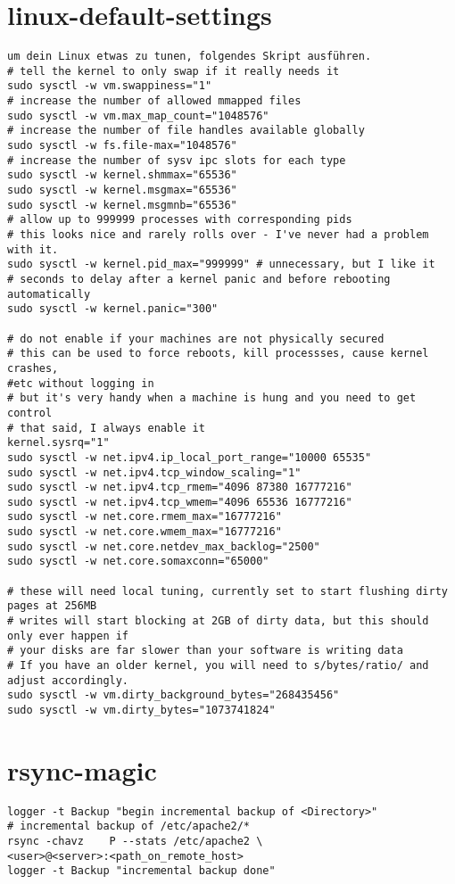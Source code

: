 \documentclass[a4paper,10pt]{report}
\begin{document}
\section{linux-default-settings}
\begin{verbatim}
um dein Linux etwas zu tunen, folgendes Skript ausführen.
# tell the kernel to only swap if it really needs it
sudo sysctl -w vm.swappiness="1"
# increase the number of allowed mmapped files
sudo sysctl -w vm.max_map_count="1048576"
# increase the number of file handles available globally
sudo sysctl -w fs.file-max="1048576"
# increase the number of sysv ipc slots for each type
sudo sysctl -w kernel.shmmax="65536"
sudo sysctl -w kernel.msgmax="65536"
sudo sysctl -w kernel.msgmnb="65536"
# allow up to 999999 processes with corresponding pids
# this looks nice and rarely rolls over - I've never had a problem with it.
sudo sysctl -w kernel.pid_max="999999" # unnecessary, but I like it
# seconds to delay after a kernel panic and before rebooting automatically
sudo sysctl -w kernel.panic="300"

# do not enable if your machines are not physically secured
# this can be used to force reboots, kill processses, cause kernel crashes, 
#etc without logging in
# but it's very handy when a machine is hung and you need to get control
# that said, I always enable it
kernel.sysrq="1"
sudo sysctl -w net.ipv4.ip_local_port_range="10000 65535"
sudo sysctl -w net.ipv4.tcp_window_scaling="1"
sudo sysctl -w net.ipv4.tcp_rmem="4096 87380 16777216"
sudo sysctl -w net.ipv4.tcp_wmem="4096 65536 16777216"
sudo sysctl -w net.core.rmem_max="16777216"
sudo sysctl -w net.core.wmem_max="16777216"
sudo sysctl -w net.core.netdev_max_backlog="2500"
sudo sysctl -w net.core.somaxconn="65000"

# these will need local tuning, currently set to start flushing dirty pages at 256MB
# writes will start blocking at 2GB of dirty data, but this should only ever happen if
# your disks are far slower than your software is writing data
# If you have an older kernel, you will need to s/bytes/ratio/ and adjust accordingly.
sudo sysctl -w vm.dirty_background_bytes="268435456"
sudo sysctl -w vm.dirty_bytes="1073741824"
\end{verbatim}

\section{rsync-magic}
\begin{verbatim}
logger -t Backup "begin incremental backup of <Directory>"
# incremental backup of /etc/apache2/*
rsync -chavz	P --stats /etc/apache2 \
<user>@<server>:<path_on_remote_host>
logger -t Backup "incremental backup done"
\end{verbatim}
\pagebreak
\end{document}
